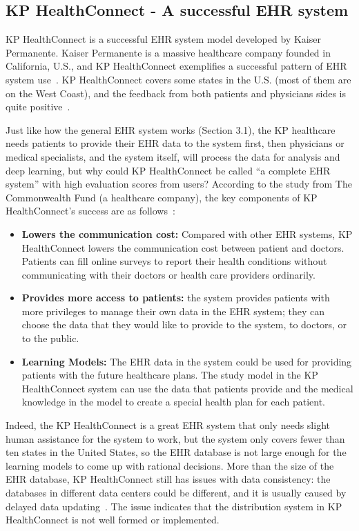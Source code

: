 \subsection{KP HealthConnect - A successful EHR system}
KP HealthConnect is a successful EHR system model developed by Kaiser 
Permanente. Kaiser Permanente is a massive healthcare company 
founded in California, U.S., and KP HealthConnect 
exemplifies a successful pattern 
of EHR system use~\cite{kp1}. KP HealthConnect covers 
some states in the U.S. 
(most of them are on the West Coast), and the feedback from both patients 
and physicians sides is quite positive~\cite{kp1}.

Just like how the general EHR system works (Section 3.1), 
the KP healthcare 
needs patients to provide their EHR data to the system first, then physicians 
or medical specialists, and the system itself, 
will process the data for analysis
and deep learning, but why could KP HealthConnect be called 
``a complete EHR system'' 
with high evaluation scores from users? According to the 
study from The Commonwealth Fund (a healthcare company), the key 
components of  KP HealthConnect's success are as 
follows~\cite{McCarthy2009}:
\begin{itemize}
	\item \textbf{Lowers the communication cost:} Compared with other 
	EHR systems, KP HealthConnect lowers the communication 
	cost between 
	patient and doctors. Patients can fill online surveys to report their 
	health conditions without communicating with their doctors or health 
	care providers ordinarily. 
	\item \textbf{Provides more access to patients:} the system provides 
	patients with more privileges to manage their 
	own data in the EHR system; 
	they can choose the data that they would like to provide 
	to the system, 
	to doctors, or to the public. 
	\item \textbf{Learning Models:} The EHR data in the system could be 
	used for providing patients with the future healthcare plans. The study 
	model in the KP HealthConnect system can use the 
	data that patients provide 
	and the medical knowledge in the model to create a special health 
	plan for each patient. 
\end{itemize}
Indeed, the KP HealthConnect is a great EHR 
system that only needs slight
human assistance for the system to work, 
but the system only covers fewer
than ten states in the United States, so the EHR 
database is not large enough for 
the learning models to come up with rational decisions. 
More than the size 
of the EHR database, KP HealthConnect still has issues 
with data consistency: 
the databases in different data centers could be different, 
and it is usually caused by delayed data 
updating~\cite{Suarez2013}. The 
issue indicates that the distribution system in KP HealthConnect is 
not well formed or implemented. 

